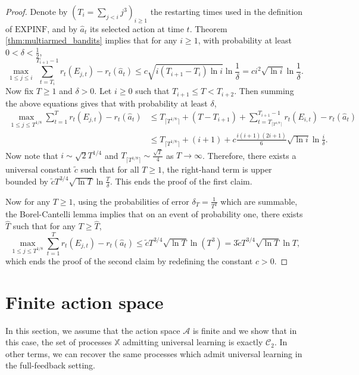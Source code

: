 \documentclass[aos]{imsart}
\theoremstyle{plain}
\theoremstyle{remark}
\newcommand{\Acal}{\mathcal{A}}
\newcommand{\Ccal}{\mathcal{C}}
\newcommand{\Xbb}{\mathbb{X}}
\newcommand{\1}{\mathbbm{1}}%
\newcommand{\EXPINF}{\mathrm{EXPINF}}
\begin{document}
\begin{proof}
Denote by $(T_i =\sum_{j< i} j^3)_{i\geq 1}$ the restarting times used in the definition of $\EXPINF$, and by $\hat a_t$ its selected action at time $t$. Theorem \ref{thm:multiarmed_bandits} implies that for any $i\geq 1$, with probability at least $0<\delta<\frac{1}{2}$,
\begin{equation*}
    \max_{1\leq j\leq i} \sum_{t=T_i}^{T_{i+1}-1} r_t(E_{j,t})-r_t(\hat a_t) \leq c\sqrt{i(T_{i+1}-T_i)\ln i} \ln\frac{1}{\delta} = c i^2\sqrt{\ln i} \ln\frac{1}{\delta}.
\end{equation*}
Now fix $T\geq 1$ and $\delta>0$. Let $i\geq 0$ such that $T_{i+1}\leq T<T_{i+2}$. Then summing the above equations gives that with probability at least $\delta$,
\begin{align*}
    \max_{1\leq j\leq T^{1/8}}\sum_{t=1}^T r_t(E_{j,t})-r_t(\hat a_t) &\leq T_{\lceil T^{1/8}\rceil} + (T-T_{i+1})+ \sum_{t=T_{\lceil T^{1/8}\rceil}}^{T_{i+1}-1} r_t(E_{i,t})-r_t(\hat a_t) \\
    &\leq T_{\lceil T^{1/8}\rceil} + (i+1) + c\frac{i(i+1)(2i+1)}{6} \sqrt{\ln i}\ln\frac{i}{\delta}.
\end{align*}
Now note that $i\sim \sqrt 2 T^{1/4}$ and $T_{\lceil T^{1/8}\rceil}\sim \frac{\sqrt T}{4}$ as $T\to\infty$. Therefore, there exists a universal constant $\tilde c$ such that for all $T\geq 1$, the right-hand term is upper bounded by $\tilde c T^{3/4}\sqrt{\ln T}\ln\frac{T}{\delta}$. This ends the proof of the first claim.

Now for any $T\geq 1$, using the probabilities of error $\delta_T=\frac{1}{T^2}$ which are summable, the Borel-Cantelli lemma implies that on an event of probability one, there exists $\hat T$ such that for any $T\geq \hat T$,
\begin{equation*}
    \max_{1\leq j\leq T^{1/8}}\sum_{t=1}^T r_t(E_{j,t})-r_t(\hat a_t) \leq \tilde c T^{3/4}\sqrt{\ln T}\ln(T^3) = 3\tilde c T^{3/4}\sqrt{\ln T}\ln T,
\end{equation*}
which ends the proof of the second claim by redefining the constant $c>0$.
\end{proof}




\section{Finite action space}
\label{sec:finite-actions}

In this section, we assume that the action space $\Acal$ is finite and we show that in this case, the set of processes $\Xbb$ admitting universal learning is exactly $\Ccal_2$. In other terms, we can recover the same processes which admit universal learning in the full-feedback setting.
\end{document}
